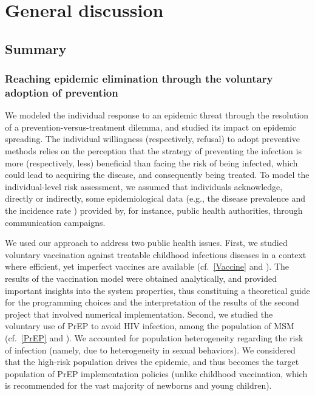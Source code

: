 %
\chapter{General discussion}
\label{Discussion}

\section{Summary}

\subsection{Reaching epidemic elimination through the voluntary adoption of prevention}

We modeled the individual response to an epidemic threat through the resolution of a prevention-versus-treatment dilemma, and studied its impact on epidemic spreading. The individual willingness (respectively, refusal) to adopt preventive methods relies on the perception that the strategy of preventing the infection is more (respectively, less) beneficial than facing the risk of being infected, which could lead to acquiring the disease, and consequently being treated. To model the individual-level risk assessment, we assumed that individuals acknowledge, directly or indirectly, some epidemiological data (e.g., the disease prevalence \cite[]{Jijon2017} and the incidence rate \cite[]{Jijon2021}) provided by, for instance, public health authorities, through communication campaigns. 

We used our approach to address two public health issues. First, we studied voluntary vaccination against treatable childhood infectious diseases in a context where efficient, yet imperfect vaccines are available (cf.~\autoref{Vaccine} and \cite[]{Jijon2017}). The results of the vaccination model were obtained analytically, and provided important insights into the system properties, thus constituing a theoretical guide for the programming choices and the interpretation of the results of the second project that involved numerical implementation. Second, we studied the voluntary use of PrEP to avoid HIV infection, among the population of MSM (cf.~\autoref{PrEP} and \cite[]{Jijon2021}). We accounted for population heterogeneity regarding the risk of infection (namely, due to heterogeneity in sexual behaviors). We considered that the high-risk population drives the epidemic, and thus becomes the target population of PrEP implementation policies (unlike childhood vaccination, which is recommended for the vast majority of newborns and young children). 

